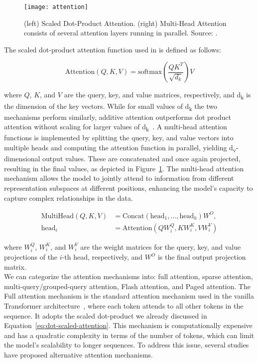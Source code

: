 \begin{figure}[h]
	\centering
	\texttt{[image: attention]}
	\caption{(left) Scaled Dot-Product Attention. (right) Multi-Head Attention consists of several attention layers running in parallel. Source: \textcite{vaswani2023attention}.}
	\label{fig:attention}
\end{figure}

The scaled dot-product attention function used in \textcite{vaswani2023attention} is defined as follows:

\begin{equation}
	\text{Attention}(Q, K, V) = \text{softmax}\left(\frac{QK^T}{\sqrt{d_k}}\right)V
	\label{eq:dot-scaled-attention}
\end{equation}

\noindent where \(Q\), \(K\), and \(V\) are the query, key, and value matrices, respectively, and d\textsubscript{k} is the dimension of the key vectors.
While for small values of d\textsubscript{k} the two mechanisms perform similarly, additive attention outperforms dot product attention without scaling for larger values of d\textsubscript{k}~\cite{britz2017massive}.
A multi-head attention functions is implemented by splitting the query, key, and value vectors into multiple heads and computing the attention function in parallel, yielding d\textsubscript{v}-dimensional output values.
These are concatenated and once again projected, resulting in the final values, as depicted in Figure~\ref{fig:attention}.
The multi-head attention mechanism allows the model to jointly attend to information from different representation subspaces at different positions, enhancing the model's capacity to capture complex relationships in the data.

\begin{equation}
	\begin{aligned}
		\text{MultiHead}(Q, K, V) & = \text{Concat}(\text{head}_1, \ldots, \text{head}_h)W^O, \\
		\text{head}_i             & = \text{Attention}(QW_i^Q, KW_i^K, VW_i^V)
	\end{aligned}
	\label{eq:multihead-attention}
\end{equation}

\noindent where \(W_i^Q\), \(W_i^K\), and \(W_i^V\) are the weight matrices for the query, key, and value projections of the \(i\)-th head, respectively, and \(W^O\) is the final output projection matrix.\\

We can categorize the attention mechanisms into: full attention, sparse attention, multi-query/grouped-query attention, Flash attention, and Paged attention.
The Full attention mechanism is the standard attention mechanism used in the vanilla Transformer architecture~\cite{vaswani2023attention}, where each token attends to all other tokens in the sequence.
It adopts the scaled dot-product we already discussed in Equation~\ref{eq:dot-scaled-attention}.
This mechanism is computationally expensive and has a quadratic complexity in terms of the number of tokens, which can limit the model's scalability to longer sequences.
To address this issue, several studies have proposed alternative attention mechanisms.

